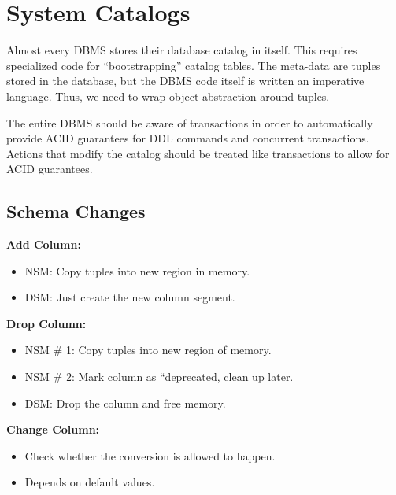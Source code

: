 \documentclass[11pt]{article}
\begin{document}
\maketitle
\thispagestyle{plain}

\section{System Catalogs}
Almost every DBMS stores their database catalog in itself. This requires specialized code for 
``bootstrapping'' catalog tables.
The meta-data are tuples stored in the database, but the DBMS code itself is written an imperative 
language. Thus, we need to wrap object abstraction around tuples.

The entire DBMS should be aware of transactions in order to automatically provide ACID 
guarantees for DDL commands and concurrent transactions.
Actions that modify the catalog should be treated like transactions to allow for ACID guarantees.

\subsection{Schema Changes}

\textbf{Add Column:}
\begin{itemize}
    \item NSM:
    Copy tuples into new region in memory.
    
    \item DSM:
    Just create the new column segment.
\end{itemize}

\textbf{Drop Column:}
\begin{itemize}
    \item NSM \# 1: 
    Copy tuples into new region of memory.
    
    \item NSM \# 2: 
    Mark column as ``deprecated, clean up later.
    
    \item DSM:
    Drop the column and free memory.
\end{itemize}

\textbf{Change Column:}
\begin{itemize}
    \item
    Check whether the conversion is allowed to happen.
    
    \item
    Depends on default values.
\end{itemize}
\end{document}
